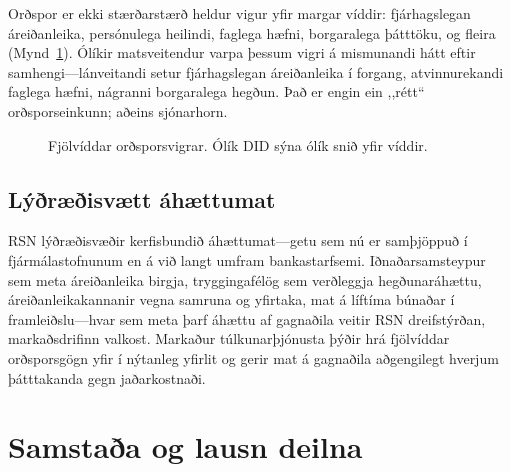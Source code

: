 \documentclass[11pt,a4paper,twocolumn]{article}
\begin{document}
Orðspor er ekki stærðarstærð heldur vigur yfir margar víddir: fjárhagslegan áreiðanleika, persónulega heilindi, faglega hæfni, borgaralega þátttöku, og fleira (Mynd~\ref{fig:reputation-radar}). Ólíkir matsveitendur varpa þessum vigri á mismunandi hátt eftir samhengi---lánveitandi setur fjárhagslegan áreiðanleika í forgang, atvinnurekandi faglega hæfni, nágranni borgaralega hegðun. Það er engin ein ,,rétt`` orðsporseinkunn; aðeins sjónarhorn.

\begin{figure}[ht]
\centering
{}
\caption{Fjölvíddar orðsporsvigrar. Ólík DID sýna ólík snið yfir víddir.}
\label{fig:reputation-radar}
\end{figure}

\subsection{Lýðræðisvætt áhættumat}

RSN lýðræðisvæðir kerfisbundið áhættumat---getu sem nú er samþjöppuð í fjármálastofnunum en á við langt umfram bankastarfsemi. Iðnaðarsamsteypur sem meta áreiðanleika birgja, tryggingafélög sem verðleggja hegðunaráhættu, áreiðanleikakannanir vegna samruna og yfirtaka, mat á líftíma búnaðar í framleiðslu---hvar sem meta þarf áhættu af gagnaðila veitir RSN dreifstýrðan, markaðsdrifinn valkost. Markaður túlkunarþjónusta þýðir hrá fjölvíddar orðsporsgögn yfir í nýtanleg yfirlit og gerir mat á gagnaðila aðgengilegt hverjum þátttakanda gegn jaðarkostnaði.

\section{Samstaða og lausn deilna}
\end{document}
